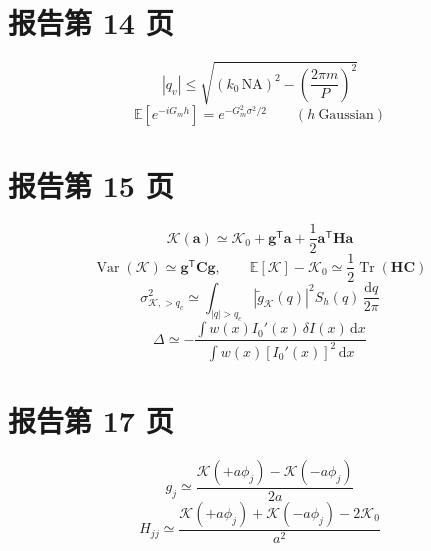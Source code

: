 \documentclass[UTF8,11pt,a4paper]{ctexart}
\begin{document}
\section*{报告第 14 页}
\begin{equation*}
 |q_v|\leq\sqrt{(k_0\,\mathrm{NA})^2-\left(\frac{2\pi m}{P}\right)^2}
\end{equation*}
\begin{equation*}
 \mathbb{E}\!\left[e^{-iG_m h}\right]=e^{-G_m^2\sigma^2/2}\qquad(h\ \text{Gaussian})
\end{equation*}

\section*{报告第 15 页}
\begin{equation*}
 \mathcal{K}(\mathbf{a})\simeq\mathcal{K}_0+\mathbf{g}^{\mathsf T}\mathbf{a}+\frac12\mathbf{a}^{\mathsf T}\mathbf{H}\mathbf{a}
\end{equation*}
\begin{equation*}
 \operatorname{Var}(\mathcal{K})\simeq\mathbf{g}^{\mathsf T}\mathbf{C}\mathbf{g},\qquad\mathbb{E}[\mathcal{K}]-\mathcal{K}_0\simeq\frac12\operatorname{Tr}(\mathbf{H}\mathbf{C})
\end{equation*}
\begin{equation*}
 \sigma^2_{\mathcal{K},>q_c}\simeq\int_{|q|>q_c}|\widetilde{g}_{\mathcal{K}}(q)|^2S_h(q)\,\frac{\mathrm{d}q}{2\pi}
\end{equation*}
\begin{equation*}
 \Delta\simeq-\frac{\int w(x)I_0\prime(x)\,\delta I(x)\,\mathrm{d}x}{\int w(x)[I_0\prime(x)]^2\,\mathrm{d}x}
\end{equation*}

\section*{报告第 17 页}
\begin{equation*}
 g_j\simeq\frac{\mathcal{K}(+a\phi_j)-\mathcal{K}(-a\phi_j)}{2a}
\end{equation*}
\begin{equation*}
 H_{jj}\simeq\frac{\mathcal{K}(+a\phi_j)+\mathcal{K}(-a\phi_j)-2\mathcal{K}_0}{a^2}
\end{equation*}
\end{document}
